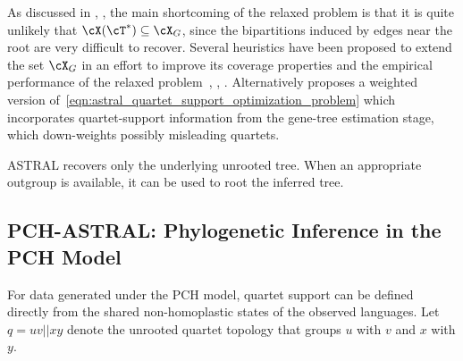 As discussed in \cite{uricchio2016_bipartition_cover}, \cite{mcnulty2026_improved_bipartition_cover_bound}, the main shortcoming of the relaxed problem
is that it is quite unlikely that $\cX(\cT^*) \subseteq \cX_G$, since the bipartitions induced by edges near the root are very
difficult to recover. Several heuristics have been proposed to extend the set $\cX_G$ in an effort to improve its coverage
properties and the empirical performance of the relaxed problem~\cite{mirarab2015_astral_ii_species_tree_estimation}, \cite{zhang2018_astral_iii_species_tree_reconstruction}, \cite{dibaeinia2021_fastral_scalable_phylogenomics}.
Alternatively \cite{zhang2022_weighting_gene_tree_uncertainty} proposes a weighted version of~\eqref{eqn:astral_quartet_support_optimization_problem}
which incorporates quartet-support information from the gene-tree estimation stage, which down-weights possibly misleading quartets.

ASTRAL recovers only the underlying unrooted tree. When an appropriate outgroup is available, it can be used to root the inferred tree.

\subsection{PCH-ASTRAL: Phylogenetic Inference in the PCH Model}

For data generated under the PCH model, quartet support can be defined directly from the
shared non-homoplastic states of the observed languages. Let $q = uv||xy$ denote the unrooted
quartet topology that groups $u$ with $v$ and $x$ with $y$.

\begin{center}
\end{center}

